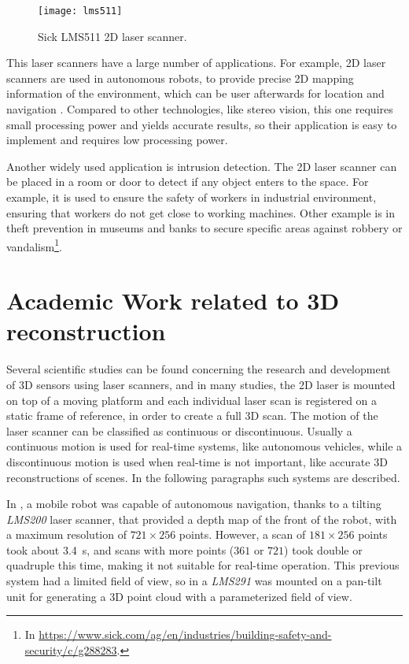 \begin{figure}
    \centering
    \texttt{[image: lms511]}
    \caption{Sick LMS511 2D laser scanner.}
    \label{fig:sick-lms511}
\end{figure}

This laser scanners have a large number of applications. For example, 2D laser scanners are used in autonomous robots, to provide precise 2D mapping information of the environment, which can be user afterwards for location and navigation \cite{siritanawan17}. Compared to other technologies, like stereo vision, this one requires small processing power and yields accurate results, so their application is easy to implement and requires low processing power. 

Another widely used application is intrusion detection. The 2D laser scanner can be placed in a room or door to detect if any object enters to the space. For example, it is used to ensure the safety of workers in industrial environment, ensuring that workers do not get close to working machines. Other example is in theft prevention in museums and banks to secure specific areas against robbery or vandalism\footnote{In \url{https://www.sick.com/ag/en/industries/building-safety-and-security/c/g288283}.}.

\section{Academic Work related to 3D reconstruction}

Several scientific studies can be found concerning the research and development of 3D sensors using laser scanners, and in many studies, the 2D laser is mounted on top of a moving platform and each individual laser scan is registered on a static frame of reference, in order to create a full 3D scan. The motion of the laser scanner can be classified as continuous or discontinuous. Usually a continuous motion is used for real-time systems, like autonomous vehicles, while a discontinuous motion is used when real-time is not important, like accurate 3D reconstructions of scenes. In the following paragraphs such systems are described.

In \cite{surmann03}, a mobile robot was capable of autonomous navigation, thanks to a tilting \textit{LMS200} laser scanner, that provided a depth map of the front of the robot, with a maximum resolution of $721\times256$ points. However, a scan of $181\times256$ points took about \SI{3.4}{\second}, and scans with more points ($361$ or $721$) took double or quadruple this time, making it not suitable for real-time operation. This previous system had a limited field of view, so in \cite{zcai05} a \textit{LMS291} was mounted on a pan-tilt unit for generating a 3D point cloud with a parameterized field of view.

